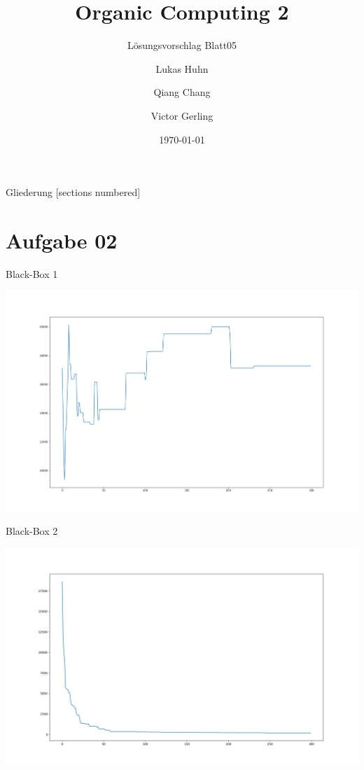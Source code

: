 \documentclass{ocbeameruni}
\title{Organic Computing 2}
\subtitle{Lösungsvorschlag Blatt05}
\date{\today}
\author{Lukas Huhn \and Qiang Chang \and Victor Gerling}
\institute{%
  Universität Augsburg\\
  Institut für Informatik\\
  Lehrstuhl für Organic Computing
}
\begin{document}
\maketitle


\begin{frame}{Gliederung}
  [sections numbered]
  \tableofcontents
\end{frame}

\section{Aufgabe 02}

\begin{frame}{Black-Box 1}
    \begin{center}
    \includegraphics[scale=0.2]{plots/bb1.png}
    \end{center}
\end{frame}

\begin{frame}{Black-Box 2}
    \begin{center}
    \includegraphics[scale=0.25]{plots/bb2.png}
    \end{center}
\end{frame}
\end{document}
